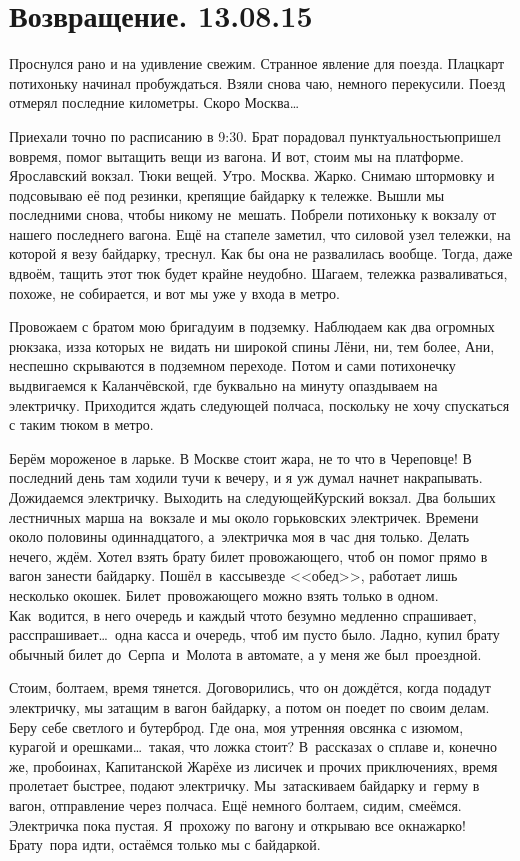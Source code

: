 \chapter{Возвращение. 13.08.15}

Проснулся рано и на удивление свежим. Странное явление для поезда. Плацкарт потихоньку начинал пробуждаться. Взяли снова чаю, немного перекусили. Поезд отмерял последние километры. Скоро Москва\ldots~

Приехали точно по расписанию в 9:30. Брат порадовал пунктуальностью\mdash пришел вовремя, помог вытащить вещи из вагона. И вот, стоим мы на платформе. Ярославский вокзал. Тюки вещей. Утро. Москва. Жарко. Снимаю штормовку и подсовываю её под резинки, крепящие байдарку к тележке. Вышли мы последними снова, чтобы никому не~мешать. Побрели потихоньку к вокзалу от нашего последнего вагона. Ещё на стапеле заметил, что силовой узел тележки, на которой я везу байдарку, треснул. Как бы она не развалилась вообще. Тогда, даже вдвоём, тащить этот тюк будет крайне неудобно. Шагаем, тележка разваливаться, похоже, не собирается, и вот мы уже у входа в метро. 

Провожаем с братом мою бригаду\mdash им в подземку. Наблюдаем как два огромных рюкзака, из\sdash за которых не~видать ни широкой спины Лёни, ни, тем более, Ани, неспешно скрываются в подземном переходе. Потом и сами потихонечку выдвигаемся к Каланчёвской, где буквально на минуту опаздываем на электричку. Приходится ждать следующей полчаса, поскольку не хочу спускаться с таким тюком в метро. 

Берём мороженое в ларьке. В Москве стоит жара, не то что в Череповце! В последний день там ходили тучи к вечеру, и я уж думал начнет накрапывать. Дожидаемся электричку. Выходить на следующей\mdash Курский вокзал. Два больших лестничных марша на~вокзале и мы около горьковских электричек. Времени около половины одиннадцатого, а~электричка моя в час дня только. Делать нечего, ждём. Хотел взять брату билет провожающего, чтоб он помог прямо в вагон занести байдарку. Пошёл в~кассы\mdash везде <<обед>>, работает лишь несколько окошек. Билет~провожающего можно взять только в одном. Как~водится, в него очередь и каждый что\sdash то безумно медленно спрашивает, расспрашивает\ldots~одна касса и очередь, чтоб им пусто было. Ладно, купил брату обычный билет до~Серпа~и~Молота в автомате, а у меня же был~проездной. 

Стоим, болтаем, время тянется. Договорились, что он дождётся, когда подадут электричку, мы затащим в вагон байдарку, а потом он поедет по своим делам. Беру себе светлого и бутерброд. Где она, моя утренняя овсянка с изюмом, курагой и орешками\ldots~такая, что ложка стоит? В~рассказах о сплаве и, конечно же, пробоинах, Капитанской Жарёхе из лисичек и прочих приключениях, время пролетает быстрее, подают электричку. Мы~затаскиваем байдарку и~герму в вагон, отправление через полчаса. Ещё немного болтаем, сидим, смеёмся. Электричка пока пустая. Я~прохожу по вагону и открываю все окна\mdash жарко! Брату~пора идти, остаёмся только мы с байдаркой. 

